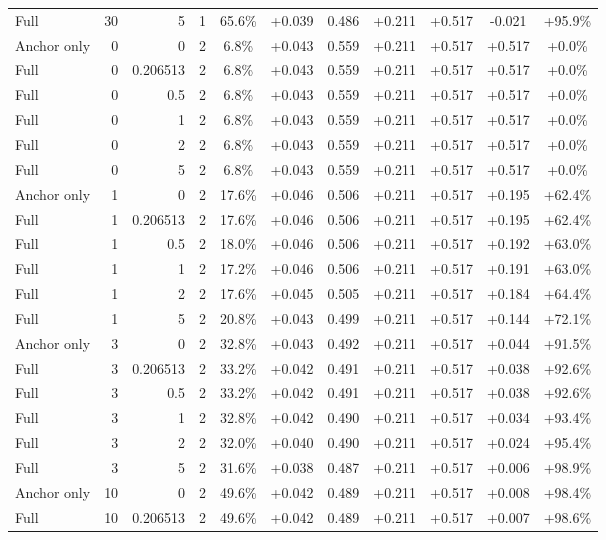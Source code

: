 \begin{table}[htbp]
\begin{tabular}{lrrrccccccc}
Full & 30 & 5 & 1 & 65.6\% & +0.039 & 0.486 & +0.211 & +0.517 & -0.021 & +95.9\% \\
Anchor only & 0 & 0 & 2 & 6.8\% & +0.043 & 0.559 & +0.211 & +0.517 & +0.517 & +0.0\% \\
Full & 0 & 0.206513 & 2 & 6.8\% & +0.043 & 0.559 & +0.211 & +0.517 & +0.517 & +0.0\% \\
Full & 0 & 0.5 & 2 & 6.8\% & +0.043 & 0.559 & +0.211 & +0.517 & +0.517 & +0.0\% \\
Full & 0 & 1 & 2 & 6.8\% & +0.043 & 0.559 & +0.211 & +0.517 & +0.517 & +0.0\% \\
Full & 0 & 2 & 2 & 6.8\% & +0.043 & 0.559 & +0.211 & +0.517 & +0.517 & +0.0\% \\
Full & 0 & 5 & 2 & 6.8\% & +0.043 & 0.559 & +0.211 & +0.517 & +0.517 & +0.0\% \\
Anchor only & 1 & 0 & 2 & 17.6\% & +0.046 & 0.506 & +0.211 & +0.517 & +0.195 & +62.4\% \\
Full & 1 & 0.206513 & 2 & 17.6\% & +0.046 & 0.506 & +0.211 & +0.517 & +0.195 & +62.4\% \\
Full & 1 & 0.5 & 2 & 18.0\% & +0.046 & 0.506 & +0.211 & +0.517 & +0.192 & +63.0\% \\
Full & 1 & 1 & 2 & 17.2\% & +0.046 & 0.506 & +0.211 & +0.517 & +0.191 & +63.0\% \\
Full & 1 & 2 & 2 & 17.6\% & +0.045 & 0.505 & +0.211 & +0.517 & +0.184 & +64.4\% \\
Full & 1 & 5 & 2 & 20.8\% & +0.043 & 0.499 & +0.211 & +0.517 & +0.144 & +72.1\% \\
Anchor only & 3 & 0 & 2 & 32.8\% & +0.043 & 0.492 & +0.211 & +0.517 & +0.044 & +91.5\% \\
Full & 3 & 0.206513 & 2 & 33.2\% & +0.042 & 0.491 & +0.211 & +0.517 & +0.038 & +92.6\% \\
Full & 3 & 0.5 & 2 & 33.2\% & +0.042 & 0.491 & +0.211 & +0.517 & +0.038 & +92.6\% \\
Full & 3 & 1 & 2 & 32.8\% & +0.042 & 0.490 & +0.211 & +0.517 & +0.034 & +93.4\% \\
Full & 3 & 2 & 2 & 32.0\% & +0.040 & 0.490 & +0.211 & +0.517 & +0.024 & +95.4\% \\
Full & 3 & 5 & 2 & 31.6\% & +0.038 & 0.487 & +0.211 & +0.517 & +0.006 & +98.9\% \\
Anchor only & 10 & 0 & 2 & 49.6\% & +0.042 & 0.489 & +0.211 & +0.517 & +0.008 & +98.4\% \\
Full & 10 & 0.206513 & 2 & 49.6\% & +0.042 & 0.489 & +0.211 & +0.517 & +0.007 & +98.6\% \\

\end{tabular}
\end{table}
